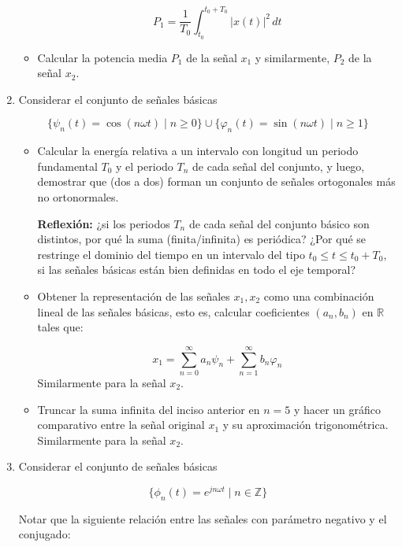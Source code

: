 \documentclass[12pt,a4paper]{report}
\begin{document}
\begin{enumerate}[label=\alph*),left=0pt]
\begin{itemize}[left=0pt]
     $$P_1 = \frac{1}{T_0} \int_{t_0}^{t_0 + T_0} |x(t)|^2 \, dt$$

    \item Calcular la potencia media $P_1$ de la señal $x_1$ y similarmente, $P_2$ de la señal $x_2$.

  \end{itemize}

  \item Considerar el conjunto de señales básicas

  $$\{\psi_n(t) = \cos(n\omega t) \mid n \geq 0\} \cup \{\varphi_n(t) = \sin(n\omega t) \mid n \geq 1\}$$

    \begin{itemize}[left=0pt]
    \item Calcular la energía relativa a un intervalo con longitud un periodo fundamental $T_0$ y el periodo $T_n$
      de cada señal del conjunto, y luego, demostrar que (dos a dos) forman un conjunto de señales ortogonales más no
      ortonormales.

      \textbf{Reflexión:} ¿si los periodos $T_n$ de cada señal del conjunto básico son distintos, por qué la suma 
      (finita/infinita) es periódica? ¿Por qué se restringe el dominio del tiempo en un intervalo del tipo 
      $t_0 \leq t \leq t_0 + T_0$, si las señales básicas están bien definidas en todo el eje temporal?

   \item Obtener la representación de las señales $x_1, x_2$ como una combinación lineal de las señales básicas, 
     esto es, calcular coeficientes $(a_n, b_n)$ en $\mathbb{R}$ tales que:

     $$x_1 = \sum_{n=0}^{\infty} a_n \psi_n + \sum_{n=1}^{\infty} b_n \varphi_n$$
     Similarmente para la señal $x_2$.

   \item Truncar la suma infinita del inciso anterior en $n = 5$ y hacer un gráfico comparativo entre la señal 
     original $x_1$ y su aproximación trigonométrica. Similarmente para la señal $x_2$.

  \end{itemize}

  \item Considerar el conjunto de señales básicas

  $$\{\phi_n(t) = e^{jn\omega t} \mid n \in \mathbb{Z}\}$$

  Notar que la siguiente relación entre las señales con parámetro negativo y el conjugado:


\end{enumerate}
\end{document}
